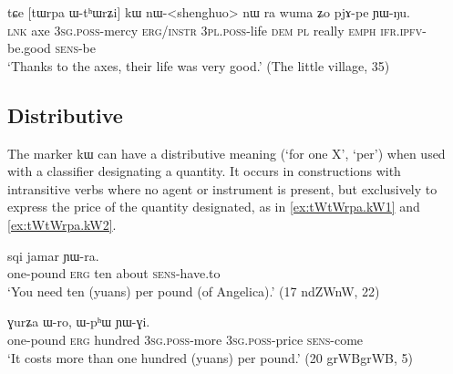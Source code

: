 \documentclass[oldfontcommands,oneside,a4paper,11pt]{article}
\newcommand{\ipa}[1]{{\phon #1}} %
\begin{document}
  \begin{exe}
\ex \label{ex:WthWrZi.kW}
\gll
\ipa{tɕe}  	[\ipa{tɯrpa}  	\ipa{ɯ-tʰɯrʑi}]  	\ipa{kɯ}  	\ipa{nɯ}-<shenghuo>  	\ipa{nɯ} \ipa{ra}  	\ipa{wuma}  	\ipa{ʑo}  	\ipa{pjɤ-pe}  	\ipa{ɲɯ-ŋu.}  \\
\textsc{lnk} axe \textsc{3sg.poss}-mercy \textsc{erg/instr} \textsc{3pl.poss}-life \textsc{dem} \textsc{pl} really \textsc{emph} \textsc{ifr.ipfv}-be.good \textsc{sens}-be \\
\glt `Thanks to the axes, their life was very good.' (The little village, 35)
  \end{exe}
  
  

 
 
\subsection{Distributive} \label{sec:distributive}
The marker \ipa{kɯ} can have   a distributive meaning (`for one X', `per') when used with a classifier designating a quantity. It occurs  in constructions with intransitive verbs where no agent or instrument is present, but exclusively to express the price of the quantity designated, as in  \ref{ex:tWtWrpa.kW1} and \ref{ex:tWtWrpa.kW2}.

 \begin{exe} 
\ex \label{ex:tWtWrpa.kW1}
\gll  
[\ipa{tɯ-tɯrpa}] 	\ipa{\textbf{kɯ}} 	\ipa{sqi} 	\ipa{jamar} 	\ipa{ɲɯ-ra.} 	\\
one-pound \textsc{erg} ten about \textsc{sens}-have.to \\
\glt `You need ten (yuans) per pound (of Angelica).' (17 ndZWnW, 22)
\end{exe}  

 \begin{exe} 
\ex \label{ex:tWtWrpa.kW2}
\gll  
[\ipa{tɯ-tɯrpa}]  	\ipa{\textbf{kɯ}}  	\ipa{ɣurʑa}  	\ipa{ɯ-ro,}  	\ipa{ɯ-pʰɯ}  	\ipa{ɲɯ-ɣi.}  \\
one-pound \textsc{erg} hundred \textsc{3sg.poss}-more \textsc{3sg.poss}-price \textsc{sens}-come \\
\glt `It costs more than one hundred (yuans) per pound.' (20 grWBgrWB, 5)
\end{exe}  
\end{document}
